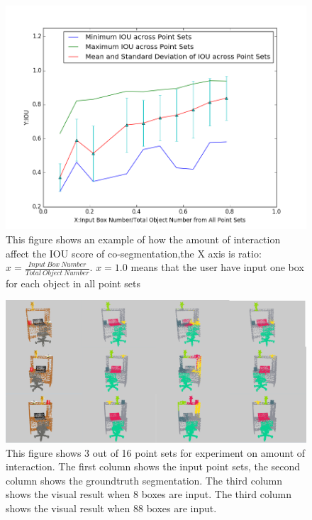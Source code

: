 \begin{figure}
	\centering
	\includegraphics[width=\linewidth]{images/interact/IOU.png}
	\caption{This figure shows an example of how the amount of interaction affect the IOU score of co-segmentation,the X axis is ratio: $x=\frac{Input~Box~Number}{Total~Object~Number}$. $x=1.0$ means that the user have input one box for each object in all point sets}
	\label{fig:interact_number}
\end{figure}

\begin{figure}
	\centering
	\includegraphics[width=\linewidth]{images/interact/interact}
	\caption{This figure shows 3 out of 16 point sets for experiment on amount of interaction. The first column shows the input point sets, the second column shows the groundtruth segmentation. The third column shows the visual result when 8 boxes are input. The third column shows the visual result when 88 boxes are input. }
	\label{fig:interact_vis}
\end{figure}



